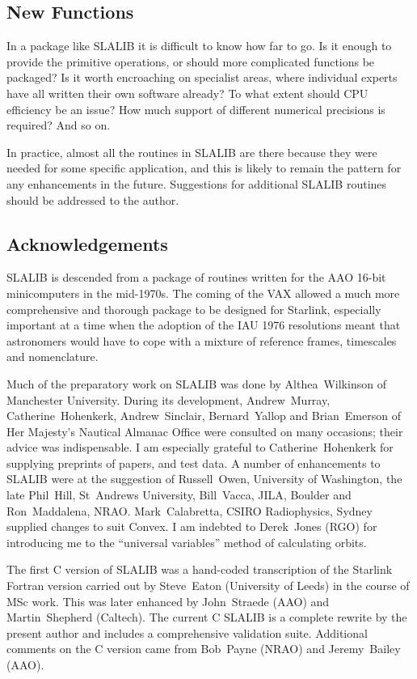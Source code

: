 \documentclass[11pt,twoside]{article}
\begin{document}
\subsection{New Functions}
In a package like SLALIB it is difficult to know how far to go.  Is it
enough to provide the primitive operations, or should more
complicated functions be packaged?  Is it worth encroaching on
specialist areas, where individual experts have all written their
own software already?  To what extent should CPU efficiency be
an issue?  How much support of different numerical precisions is
required?  And so on.

In practice, almost all the routines in SLALIB are there because they were
needed for some specific application, and this is likely to remain the
pattern for any enhancements in the future.
Suggestions for additional SLALIB routines should be addressed to the
author.

\subsection{Acknowledgements}
SLALIB is descended from a package of routines written
for the AAO 16-bit minicomputers
in the mid-1970s.  The coming of the VAX
allowed a much more comprehensive and thorough package
to be designed for Starlink, especially important
at a time when the adoption
of the IAU 1976 resolutions meant that astronomers
would have to cope with a mixture of reference frames,
timescales and nomenclature.

Much of the preparatory work on SLALIB was done by
Althea~Wilkinson of Manchester University.
During its development,
Andrew~Murray,
Catherine~Hohenkerk,
Andrew~Sinclair,
Bernard~Yallop
and
Brian~Emerson of Her Majesty's Nautical Almanac Office were consulted
on many occasions; their advice was indispensable.
I am especially grateful to
Catherine~Hohenkerk
for supplying preprints of papers, and test data. A number of
enhancements to SLALIB were at the suggestion of
Russell~Owen, University of Washington,
the late Phil~Hill, St~Andrews University,
Bill~Vacca, JILA, Boulder and
Ron~Maddalena, NRAO.
Mark~Calabretta, CSIRO Radiophysics, Sydney supplied changes to suit Convex.
I am indebted to Derek~Jones (RGO) for introducing me to the
``universal variables'' method of calculating orbits.

The first C version of SLALIB was a hand-coded transcription
of the Starlink Fortran version carried out by
Steve~Eaton (University of Leeds) in the course of
MSc work.  This was later
enhanced by John~Straede (AAO) and Martin~Shepherd (Caltech).
The current C SLALIB is a complete rewrite by the present author and
includes a comprehensive validation suite.
Additional comments on the C version came from Bob~Payne (NRAO) and
Jeremy~Bailey (AAO).
\end{document}
